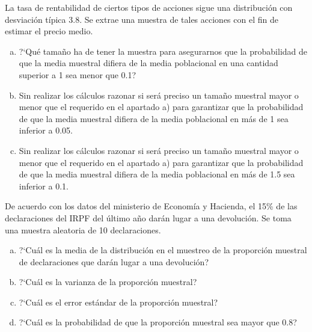 \documentclass[12pt]{article}
\begin{document}
    \begin{prob} La tasa de rentabilidad de ciertos tipos de acciones
        sigue una distribución con desviación típica 3.8. Se extrae una
        muestra de tales acciones con el fin de estimar el precio medio.
        \begin{enumerate}[a)]
        \item ?`Qué tamaño ha de tener la muestra para asegurarnos que la
        probabilidad de que la media muestral difiera de la media
        poblacional en una cantidad superior a 1 sea menor que 0.1?
        \item Sin realizar los cálculos razonar si será preciso  un tamaño
        muestral mayor o menor que el requerido  en el apartado a) para
        garantizar que la probabilidad de que la media muestral difiera
        de la media poblacional en más de 1 sea inferior a 0.05.
        \item Sin realizar los cálculos razonar si será preciso  un tamaño
        muestral mayor o menor que el requerido  en el apartado a) para
        garantizar que la probabilidad de que la media muestral difiera
        de la media poblacional en más de 1.5 sea inferior a 0.1.
        \end{enumerate}
    \end{prob}

    \begin{prob}
        De acuerdo con los datos del ministerio de Economía y Hacienda, el
        15\% de las declaraciones del IRPF del último año darán lugar a
        una devolución. Se toma una muestra aleatoria de 10 declaraciones.
        \begin{enumerate}[a)]
        \item ?`Cuál es la media de la distribución en el muestreo de la
        proporción muestral de declaraciones que darán lugar a una
        devolución?
        \item ?`Cuál es la varianza de la proporción muestral?
        \item ?`Cuál es el error estándar de la proporción muestral?
        \item ?`Cuál es la probabilidad de que la proporción muestral sea
        mayor que 0.8?
        \end{enumerate}
        \end{prob}

\end{document}
